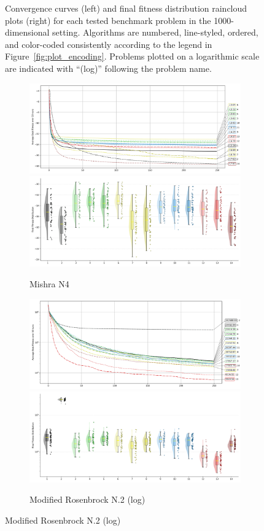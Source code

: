 \begin{figure}[p]
\captionsetup{list=no}
\caption[Convergence curves and final fitness distribution raincloud plots for 1000-dimensional problems]{Convergence curves (left) and final fitness distribution raincloud plots (right) for each tested benchmark problem in the 1000-dimensional setting. Algorithms are numbered, line-styled, ordered, and color-coded consistently according to the legend in Figure~\ref{fig:plot_encoding}. Problems plotted on a logarithmic scale are indicated with ``(log)'' following the problem name.}
\end{figure}





\begin{figure}[p]\ContinuedFloat
\renewcommand\thesubfigure{C.\arabic{figure}.\arabic{subfigure}} %
    \centering

\begin{subfigure}{1\textwidth}
    \centering
    \includegraphics[width=.49\textwidth]{Figures/results/1000/Mishra_N4_All_selected_algorithms_dim1000_annot_legend.png}
    \includegraphics[width=.49\textwidth]{Figures/results/1000/Mishra_N4_all_dim1000_raincloud_vertical.png}
    \caption{Mishra N4}
\end{subfigure}

\begin{subfigure}{1\textwidth}
    \centering
    \includegraphics[width=.49\textwidth]{Figures/results/1000/Modified_Rosenbrock_No.02___Hollow_Ground_Bent_Knife_Edge_All_selected_algorithms_dim1000_annot_legend.png}
    \includegraphics[width=.49\textwidth]{Figures/results/1000/Modified_Rosenbrock_No.02___Hollow_Ground_Bent_Knife_Edge_all_dim1000_raincloud_vertical.png}
    \caption{Modified Rosenbrock N.2 (log)}
\end{subfigure}


\end{figure}
